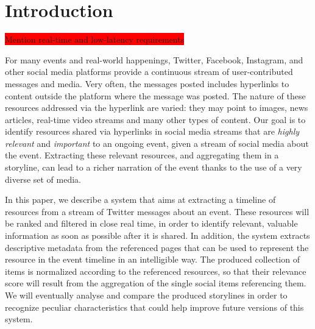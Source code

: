 \documentclass{sig-alternate}
\newcommand{\todo}[1]{\colorbox{red}{#1}}
\begin{document}


\section{Introduction}
\label{sec:introduction}

\todo{Mention real-time and low-latency requirements}



For many events and real-world happenings, Twitter, Facebook, Instagram, and other social media platforms provide a continuous stream of user-contributed messages and media. Very often, the messages posted includes hyperlinks to content outside the platform where the message was posted. The nature of these resources addressed via the hyperlink are varied: they may point to images, news articles, real-time video streams and many other types of content. Our goal is to identify resources shared via hyperlinks in social media streams that are \emph{highly relevant} and \emph{important} to an ongoing event, given a stream of social media about the event. Extracting these relevant resources, and aggregating them in a storyline, can lead to a richer narration of the event thanks to the use of a very diverse set of media.

In this paper, we describe a system that aims at extracting a timeline of resources from a stream of Twitter messages about an event. These resources will be ranked and filtered in close real time, in order to identify relevant, valuable information as soon as possible after it is shared. In addition, the system extracts descriptive metadata from the referenced pages that can be used to represent the resource in the event timeline in an intelligible way.  The produced collection of items is normalized according to the referenced resources, so that their relevance score will result from the aggregation of the single social items referencing them. We will eventually analyse and compare the produced storylines in order to recognize peculiar characteristics that could help improve future versions of this system.
\end{document}
